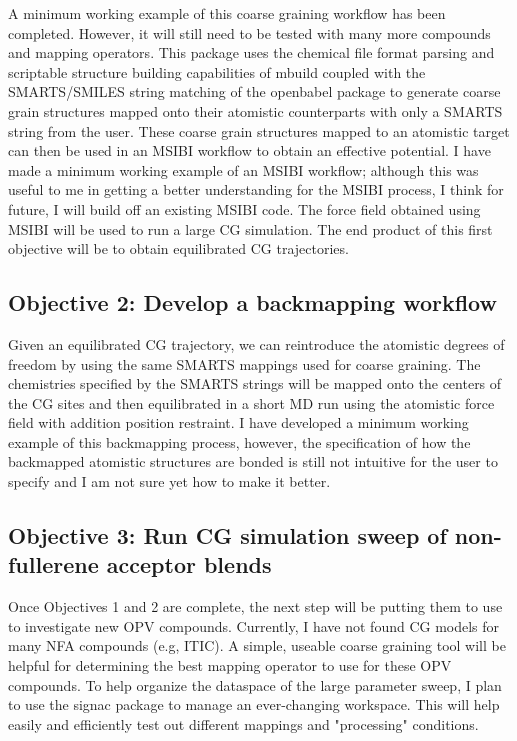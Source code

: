 A minimum working example of this coarse graining workflow has been completed. %
However, it will still need to be tested with many more compounds and mapping operators.
This package uses the chemical file format parsing and scriptable structure building capabilities of mbuild coupled with the SMARTS/SMILES string matching of the openbabel package to generate coarse grain structures mapped onto their atomistic counterparts with only a SMARTS string from the user.
These coarse grain structures mapped to an atomistic target can then be used in an MSIBI workflow to obtain an effective potential.
I have made a minimum working example of an MSIBI workflow; %
although this was useful to me in getting a better understanding for the MSIBI process, I think for future, I will build off an existing MSIBI code. %
The force field obtained using MSIBI will be used to run a large CG simulation.
The end product of this first objective will be to obtain equilibrated CG trajectories.

\subsection*{Objective 2: Develop a backmapping workflow}

Given an equilibrated CG trajectory, we can reintroduce the atomistic degrees of freedom by using the same SMARTS mappings used for coarse graining.
The chemistries specified by the SMARTS strings will be mapped onto the centers of the CG sites and then equilibrated in a short MD run using the atomistic force field with addition position restraint. 
I have developed a minimum working example of this backmapping process, %
however, the specification of how the backmapped atomistic structures are bonded is still not intuitive for the user to specify and I am not sure yet how to make it better.

\subsection*{Objective 3: Run CG simulation sweep of non-fullerene acceptor blends}

Once Objectives 1 and 2 are complete, the next step will be putting them to use to investigate new OPV compounds.
Currently, I have not found CG models for many NFA compounds (e.g, ITIC). %
A simple, useable coarse graining tool will be helpful for determining the best mapping operator to use for these OPV compounds.
To help organize the dataspace of the large parameter sweep, I plan to use the signac package to manage an ever-changing workspace.
This will help easily and efficiently test out different mappings and "processing" conditions.


